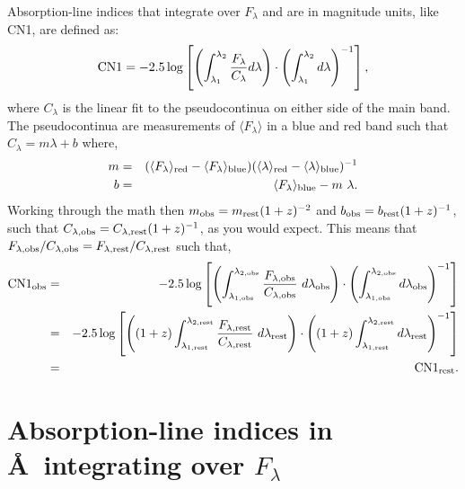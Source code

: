 \documentclass[a4paper]{article}
\begin{document}
Absorption-line indices that integrate over $F_\lambda$ and are in magnitude units, like CN1, are defined as:
%
\begin{equation}
{\rm CN1} = -2.5 \log\left[ \left( \int^{\lambda_2}_{\lambda_1} \frac{F_\lambda}{C_\lambda} d\lambda \right) \cdot \left(\int^{\lambda_2}_{\lambda_1} d\lambda\right)^{-1} \right],
\end{equation}
%
where $C_\lambda$ is the linear fit to the pseudocontinua on either side of the main band.  The pseudocontinua are measurements of $\langle F_\lambda\rangle$ in a blue and red band such that $C_\lambda = m\lambda + b$ where,
%
\begin{eqnarray}
m & = & (\langle F_{\lambda}\rangle_{\rm red} - \langle F_{\lambda}\rangle_{\rm blue}) (\langle \lambda\rangle_{\rm red} - \langle \lambda\rangle_{\rm blue})^{-1} \\
b & = & \langle F_{\lambda}\rangle_{\rm blue} - m\ \lambda.
\end{eqnarray}
%
Working through the math then $m_{\rm obs} = m_{\rm rest} (1+z)^{-2}$ and $b_{\rm obs} = b_{\rm rest} (1+z)^{-1}$, such that $C_{\lambda, {\rm obs}} = C_{\lambda, {\rm rest}}  (1+z)^{-1}$, as you would expect.  This means that $F_{\lambda,{\rm obs}}/C_{\lambda,{\rm obs}} = F_{\lambda,{\rm rest}}/C_{\lambda,{\rm rest}}$ such that,
%
\begin{eqnarray}
{\rm CN1}_{\rm obs} & = &  
-2.5\log\left[ \left(\int^{\lambda_{2,{\rm obs}}}_{\lambda_{1,{\rm obs}}} \frac{F_{\lambda,{\rm obs}}}{C_{\lambda,{\rm obs}}}\ d\lambda_{\rm obs}\right) \cdot \left( \int^{\lambda_{2,{\rm obs}}}_{\lambda_{1,{\rm obs}}} d\lambda_{\rm obs} \right)^{-1} \right] \\
& = & -2.5\log\left[ \left((1+z) \int^{\lambda_{2,{\rm rest}}}_{\lambda_{1,{\rm rest}}} \frac{F_{\lambda,{\rm rest}}}{C_{\lambda,{\rm rest}}}\ d\lambda_{\rm rest}\right) \cdot \left( (1+z) \int^{\lambda_{2,{\rm rest}}}_{\lambda_{1,{\rm rest}}} d\lambda_{\rm rest} \right)^{-1} \right] \\
& = & {\rm CN1}_{\rm rest}.
\end{eqnarray}

\section{Absorption-line indices in \AA\ integrating over $F_\lambda$}
\end{document}
